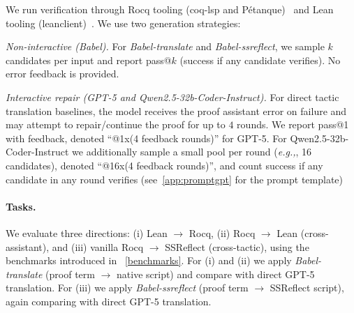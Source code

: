 \documentclass{article}
\newcommand{\eg}{\emph{e.g.,}\xspace}
\begin{document}
We run verification through Rocq tooling (coq-lsp and Pétanque)~\cite{coqlsp, nlir-mathai24} and Lean tooling (leanclient)~\cite{leanclient2025}. We use two generation strategies:

\emph{Non-interactive (Babel).}
For \textit{Babel-translate} and \textit{Babel-ssreflect}, we sample $k$ candidates per input and report pass@$k$ (success if any candidate verifies). No error feedback is provided.

\emph{Interactive repair (GPT-5 and Qwen2.5-32b-Coder-Instruct).}
For direct tactic translation baselines, the model receives the proof assistant error on failure and may attempt to repair/continue the proof for up to $4$ rounds. We report pass@1 with feedback, denoted ``@1x(4 feedback rounds)'' for GPT-5. For Qwen2.5-32b-Coder-Instruct we additionally sample a small pool per round (\eg, 16 candidates), denoted ``@16x(4 feedback rounds)'', and count success if any candidate in any round verifies (see~\cref{app:promptgpt} for the prompt template)

\paragraph{Tasks.}
We evaluate three directions:
(i) Lean $\to$ Rocq,
(ii) Rocq $\to$ Lean (cross-assistant), and
(iii) vanilla Rocq $\to$ SSReflect (cross-tactic), using the benchmarks introduced in ~\cref{benchmarks}.
For (i) and (ii) we apply \textit{Babel-translate} (proof term $\to$ native script) and compare with direct GPT-5 translation.
For (iii) we apply \textit{Babel-ssreflect} (proof term $\to$ SSReflect script), again comparing with direct GPT-5 translation.
\end{document}

